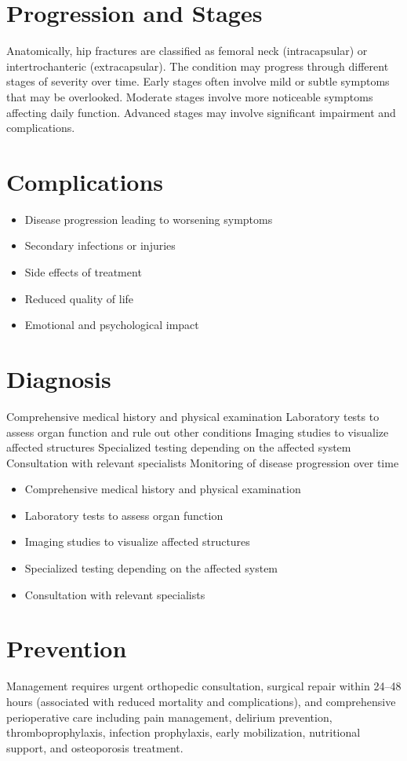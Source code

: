 \section{Progression and Stages}
Anatomically, hip fractures are classified as femoral neck (intracapsular) or intertrochanteric (extracapsular). The condition may progress through different stages of severity over time. Early stages often involve mild or subtle symptoms that may be overlooked. Moderate stages involve more noticeable symptoms affecting daily function. Advanced stages may involve significant impairment and complications.
\section{Complications}
\begin{itemize}[noitemsep]
  \item Disease progression leading to worsening symptoms
  \item Secondary infections or injuries
  \item Side effects of treatment
  \item Reduced quality of life
  \item Emotional and psychological impact
\end{itemize}
\section{Diagnosis}
Comprehensive medical history and physical examination Laboratory tests to assess organ function and rule out other conditions Imaging studies to visualize affected structures Specialized testing depending on the affected system Consultation with relevant specialists Monitoring of disease progression over time

\begin{itemize}[noitemsep]
  \item Comprehensive medical history and physical examination
  \item Laboratory tests to assess organ function
  \item Imaging studies to visualize affected structures
  \item Specialized testing depending on the affected system
  \item Consultation with relevant specialists
\end{itemize}
\section{Prevention}
Management requires urgent orthopedic consultation, surgical repair within 24--48 hours (associated with reduced mortality and complications), and comprehensive perioperative care including pain management, delirium prevention, thromboprophylaxis, infection prophylaxis, early mobilization, nutritional support, and osteoporosis treatment.

